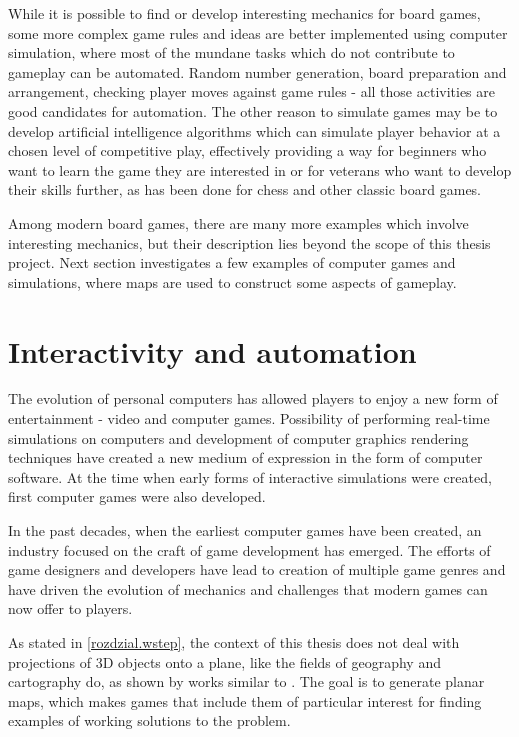 \documentclass[12pt]{report}
\begin{document}
While it is possible to find or develop interesting mechanics for board games, some more complex game rules and ideas are better implemented using computer simulation, where most of the mundane tasks which do not contribute to gameplay can be automated. Random number generation, board preparation and arrangement, checking player moves against game rules - all those activities are good candidates for automation. The other reason to simulate games may be to develop artificial intelligence algorithms which can simulate player behavior at a chosen level of competitive play, effectively providing a way for beginners who want to learn the game they are interested in or for veterans who want to develop their skills further, as has been done for chess and other classic board games. 

Among modern board games, there are many more examples which involve interesting mechanics, but their description lies beyond the scope of this thesis project. Next section investigates a few examples of computer games and simulations, where maps are used to construct some aspects of gameplay.

\section{Interactivity and automation }

The evolution of personal computers has allowed players to enjoy a new form of entertainment - video and computer games. Possibility of performing real-time simulations on computers and development of computer graphics rendering techniques have created a new medium of expression in the form of computer software. At the time when early forms of interactive simulations were created, first computer games were also developed. 

In the past decades, when the earliest computer games have been created, an industry focused on the craft of game development has emerged. The efforts of game designers and developers have lead to creation of multiple game genres and have driven the evolution of mechanics and challenges that modern games can now offer to players.

As stated in \cref{rozdzial.wstep}, the context of this thesis does not deal with projections of 3D objects onto a plane, like the fields of geography and cartography do, as shown by works similar to \autocite{snyder1993flattening}. The goal is to generate planar maps, which makes games that include them of particular interest for finding examples of working solutions to the problem. 
\end{document}
